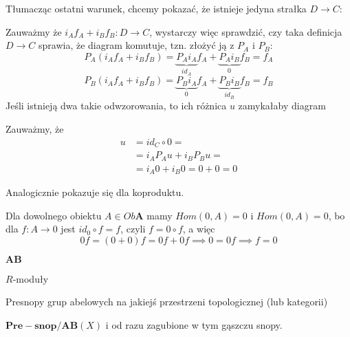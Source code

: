 Tłumacząc ostatni warunek, chcemy pokazać, że istnieje jedyna strałka $D\to C$:
\begin{center}\end{center}
Zauważmy że $i_Af_A+i_Bf_B:D\to C$, wystarczy więc sprawdzić, czy taka definicja $D\to C$ sprawia, że diagram komutuje, tzn. złożyć ją z $P_A$ i $P_B$:
$$P_A(i_Af_A+i_Bf_B)=\underbrace{P_Ai_A}_{id_A}f_A+\underbrace{P_Ai_B}_{0}f_B=f_A$$
$$P_B(i_Af_A+i_Bf_B)=\underbrace{P_Bi_A}_{0}f_A+\underbrace{P_Bi_B}_{id_B}f_B=f_B$$
Jeśli istnieją dwa takie odwzorowania, to ich różnica $u$ zamykałaby diagram
\begin{center}\end{center}Zauważmy, że 
\begin{align*}
  u&=id_C\circ 0=\\
   &=i_AP_Au+i_BP_Bu=\\
   &=i_A0+i_B0=0+0=0
\end{align*}

Analogicznie pokazuje się dla koproduktu.

\begin{dygresja}
  Dla dowolnego obiektu $A\in Ob\mathbf{A}$ mamy $Hom(0, A)=0$ i $Hom(0, A)=0$, bo dla $f:A\to 0$ jest $id_0\circ f=f$, czyli $f=0\circ f$, a więc
  $$0f=(0+0)f=0f+0f\implies 0=0f\implies f=0$$
\end{dygresja}

\begin{example}
\item $\mathbf{AB}$
\item $R$-moduły
\item Presnopy grup abelowych na jakiejś przestrzeni topologicznej (lub kategorii) 

  $\mathbf{Pre-snop/AB}(X)$ i od razu zagubione w tym gąszczu snopy.
\end{example}

